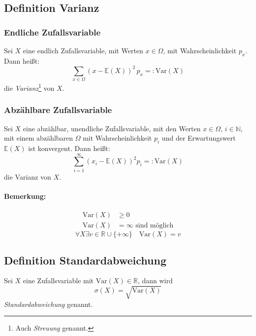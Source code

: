 \documentclass[12pt,a4paper]{article}
\begin{document}
 	\subsection{Definition Varianz}
 	\subsubsection{Endliche Zufallsvariable}
 	Sei $X$ eine endlich Zufallsvariable, mit Werten $x\in\Omega$, mit Wahrscheinlichkeit $p_x$. Dann heißt:
 	$$\sum_{x\in\Omega}\left(x-\mathbb{E}\left(X\right)\right)^2\,p_x=:\text{Var}(X)$$
 	die \textit{Varianz}\footnote{Auch \textit{Streuung} genannt.} von $X$. 
 	\subsubsection{Abzählbare Zufallsvariable}
 	Sei $X$ eine abzählbar, unendliche Zufallsvariable, mit den Werten $x\in\Omega,\,i\in\mathbb{N}$, mit einem abzählbaren $\Omega$  mit Wahrscheinlichkeit $p_i$ und der Erwartungswert $\mathbb{E}(X)$ ist konvergent. Dann heißt:
 	$$\sum_{i=1}^{\infty}\left(x_i -\mathbb{E}\left(X\right)\right)^2 p_i =:\text{Var}(X)$$
 	die Varianz von $X$.
 	\paragraph{Bemerkung:}
 	\begin{equation*}
 	\begin{split}
 	\text{Var}(X) & \geq 0\\
 	\text{Var}(X) & = \infty \text{ sind möglich}
 	\end{split}
 	\end{equation*}
 	$$\forall X\exists v\in\mathbb{R}\cup\{+\infty\}\quad \text{Var}(X)=v$$
 	\subsection{Definition Standardabweichung}
 	Sei $X$ eine Zufallsvariable mit $\text{Var}(X)\in\mathbb{R}$, dann wird
 	$$\sigma(X)=\sqrt{\text{Var}(X)}$$
 	\textit{Standardabweichung} genannt.
\end{document}
